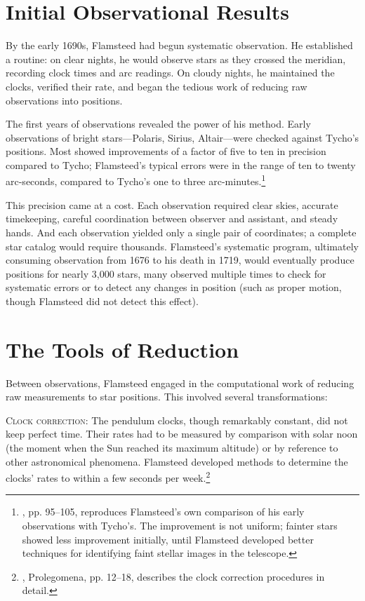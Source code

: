 \section{Initial Observational Results}
\label{sec:initial-results}

By the early 1690s, Flamsteed had begun systematic observation. He established a routine: on clear nights, he would observe stars as they crossed the meridian, recording clock times and arc readings. On cloudy nights, he maintained the clocks, verified their rate, and began the tedious work of reducing raw observations into positions.

The first years of observations revealed the power of his method. Early observations of bright stars—Polaris, Sirius, Altair—were checked against Tycho's positions. Most showed improvements of a factor of five to ten in precision compared to Tycho; Flamsteed's typical errors were in the range of ten to twenty arc-seconds, compared to Tycho's one to three arc-minutes.\footnote{\textcite{Baily1835}, pp. 95--105, reproduces Flamsteed's own comparison of his early observations with Tycho's. The improvement is not uniform; fainter stars showed less improvement initially, until Flamsteed developed better techniques for identifying faint stellar images in the telescope.}

This precision came at a cost. Each observation required clear skies, accurate timekeeping, careful coordination between observer and assistant, and steady hands. And each observation yielded only a single pair of coordinates; a complete star catalog would require thousands. Flamsteed's systematic program, ultimately consuming observation from 1676 to his death in 1719, would eventually produce positions for nearly 3,000 stars, many observed multiple times to check for systematic errors or to detect any changes in position (such as proper motion, though Flamsteed did not detect this effect).

\section{The Tools of Reduction}
\label{sec:reduction-tools}

Between observations, Flamsteed engaged in the computational work of reducing raw measurements to star positions. This involved several transformations:

\textsc{Clock correction:} The pendulum clocks, though remarkably constant, did not keep perfect time. Their rates had to be measured by comparison with solar noon (the moment when the Sun reached its maximum altitude) or by reference to other astronomical phenomena. Flamsteed developed methods to determine the clocks' rates to within a few seconds per week.\footnote{\textcite{Flamsteed1725}, Prolegomena, pp. 12--18, describes the clock correction procedures in detail.}


